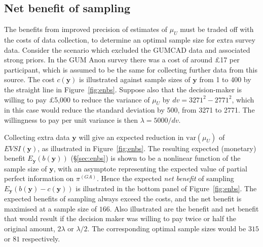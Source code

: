 \documentclass[12pt]{article}\usepackage[]{graphicx}\usepackage[]{color}
\newcommand{\var}{\mbox{var}}
\newcommand{\y}{\mathbf{y}}
\begin{document}
\subsection{Net benefit of sampling}
\label{sec:app:enbs}

The benefits from improved precision of estimates of $\mu_U$ must be traded off with the costs of data collection, to determine an optimal sample size for extra survey data.  Consider the scenario which excluded the GUMCAD data and associated strong priors.  In the GUM Anon survey there was a cost of around \pounds17 per participant, which is assumed to be the same for collecting further data from this source. The cost $c(\y)$ is illustrated against sample sizes of $\y$ from 1 to 400 by the straight line in Figure~\ref{fig:enbs}.   Suppose also that the decision-maker is willing to pay \pounds5,000 to reduce the variance of $\mu_U$ by $dv = 3271^2 - 2771^2$, which in this case would reduce the standard deviation by 500, from 3271 to 2771.  The willingness to pay per unit variance is then $\lambda = 5000 / dv$.  



Collecting extra data $\y$ will give an expected reduction in $\var(\mu_U)$ of $EVSI(\y)$, as illustrated in Figure~\ref{fig:enbs}.  The resulting expected (monetary) benefit $E_\y(b(\y))$ (\S\ref{sec:enbs}) is shown to be a nonlinear function of the sample size of $\y$, with an asymptote representing the expected value of partial perfect information on $\pi^{(GA)}$.   Hence the expected \emph{net benefit} of sampling $E_\y(b(\y) - c(\y))$ is illustrated in the bottom panel of Figure~\ref{fig:enbs}.   The expected benefits of sampling always exceed the costs, and the net benefit is maximised at a sample size of $166$.   Also illustrated are the benefit and net benefit that would result if the decision maker was willing to pay twice or half the original amount, $2\lambda$ or $\lambda/2$. The corresponding optimal sample sizes would be $315$ or $81$ respectively.
\end{document}
